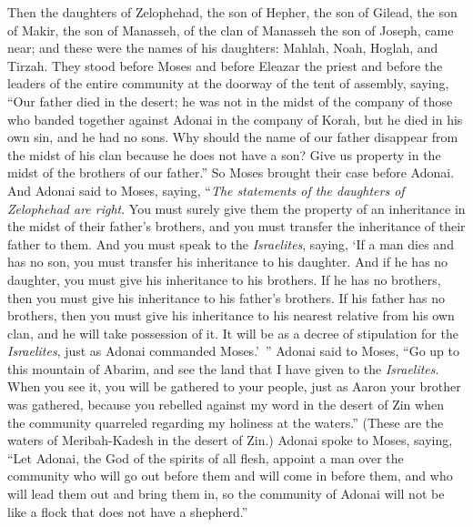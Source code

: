 \begin{biblechapter} %
 Then the daughters of Zelophehad, the son of Hepher, the son of Gilead, the son of Makir, the son of Manasseh, of the clan of Manasseh the son of Joseph, came near; and these were the names of his daughters: Mahlah, Noah, Hoglah, and Tirzah.
\verse They stood before Moses and before Eleazar the priest and before the leaders of the entire community at the doorway of the tent of assembly, saying,
\verse “Our father died in the desert; he was not in the midst of the company of those who banded together against Adonai in the company of Korah, but he died in his own sin, and he had no sons.
\verse Why should the name of our father disappear from the midst of his clan because he does not have a son? Give us property in the midst of the brothers of our father.”
\verse So Moses brought their case before Adonai.
\verse And Adonai said to Moses, saying,
\verse “\textit{The statements of the daughters of Zelophehad are right}. You must surely give them the property of an inheritance in the midst of their father’s brothers, and you must transfer the inheritance of their father to them.
\verse And you must speak to the \textit{Israelites}, saying, ‘If a man dies and has no son, you must transfer his inheritance to his daughter.
\verse And if he has no daughter, you must give his inheritance to his brothers.
\verse If he has no brothers, then you must give his inheritance to his father’s brothers.
\verse If his father has no brothers, then you must give his inheritance to his nearest relative from his own clan, and he will take possession of it. It will be as a decree of stipulation for the \textit{Israelites}, just as Adonai commanded Moses.’ ”
\verse Adonai said to Moses, “Go up to this mountain of Abarim, and see the land that I have given to the \textit{Israelites}.
\verse When you see it, you will be gathered to your people, just as Aaron your brother was gathered,
\verse because you rebelled against my word in the desert of Zin when the community quarreled regarding my holiness at the waters.” (These are the waters of Meribah-Kadesh in the desert of Zin.)
 Adonai spoke to Moses, saying,
\verse “Let Adonai, the God of the spirits of all flesh, appoint a man over the community
\verse who will go out before them and will come in before them, and who will lead them out and bring them in, so the community of Adonai will not be like a flock that does not have a shepherd.”

\end{biblechapter}
